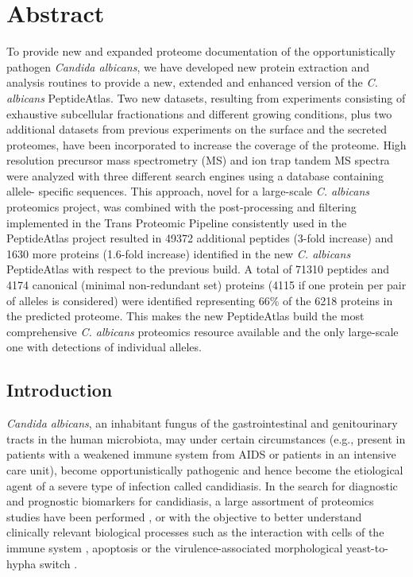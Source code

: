 \chapter*{Abstract}
To provide new and expanded proteome documentation of the opportunistically pathogen
\textit{Candida albicans}, we have developed new protein extraction and analysis routines to
provide a new, extended and enhanced version of the \textit{C. albicans} PeptideAtlas. Two new
datasets, resulting from experiments consisting of exhaustive subcellular fractionations and
different growing conditions, plus two additional datasets from previous experiments on the
surface and the secreted proteomes, have been incorporated to increase the coverage of the
proteome. High resolution precursor mass spectrometry (MS) and ion trap tandem MS
spectra were analyzed with three different search engines using a database containing allele-
specific sequences. This approach, novel for a large-scale \textit{C. albicans} proteomics project,
was combined with the post-processing and filtering
implemented in the Trans Proteomic Pipeline consistently used in the PeptideAtlas project
resulted in 49372 additional peptides (3-fold increase) and 1630 more proteins (1.6-fold increase)
identified in the new
\textit{C. albicans} PeptideAtlas with respect to the previous build. A total of 71310 peptides and
4174 canonical (minimal non-redundant set) proteins (4115 if one protein per pair of alleles is
considered) were identified representing 66\% of the 6218 proteins in the predicted proteome.
This makes the new PeptideAtlas build the most comprehensive \textit{C. albicans} proteomics
resource available and the only large-scale one with detections of individual alleles.

\newpage

\section*{Introduction}

\textit{Candida albicans}, an inhabitant fungus of the gastrointestinal and genitourinary tracts in the
human microbiota, may under certain circumstances (e.g., present in patients with a
weakened immune system from AIDS or patients in an intensive care unit), become
opportunistically pathogenic and hence become the etiological agent of a severe type of
infection called candidiasis. In the search for diagnostic and prognostic biomarkers for
candidiasis, a large assortment of proteomics studies have been performed \citep{Pitarch2011}, or with the
objective to better understand clinically relevant biological processes such as the interaction
with cells of the immune system \citep{Fernandez-Arenas2007,Cheng2012a,Gow2011}, 
apoptosis \citep{Ramsdale2008,Hao2013c} or the virulence-associated
morphological yeast-to-hypha switch \citep{Monteoliva2010,Vialas2012}. 


